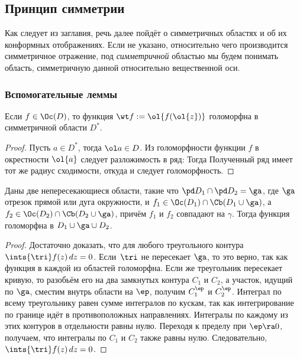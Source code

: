 \documentclass[a4paper]{article}
\begin{document}
\subsection{Принцип симметрии}

Как следует из заглавия, речь далее пойдёт о симметричных областях и об их конформных отображениях.
Если не указано, относительно чего производится симметричное отражение, под \emph{симметричной}
областью мы будем понимать область, симметричную данной относительно вещественной оси.

\subsubsection{Вспомогательные леммы}

\begin{lemma}
Если $f\in\Oc(D)$, то функция $\wt f := \ol{f(\ol{z})}$ голоморфна в симметричной области $D^*$.
\end{lemma}
\begin{proof}
Пусть $a \in D^*$, тогда $\ol a \in D$. Из голоморфности функции $f$ в окрестности $\ol{a}$ следует
разложимость в ряд:
Тогда
Полученный ряд имеет тот же радиус сходимости, откуда и следует голоморфность.
\end{proof}

\begin{lemma}
Даны две непересекающиеся области, такие что $\pd D_1 \cap \pd D_2=\ga$, где $\ga$\т отрезок прямой
или дуга окружности, и  $f_1 \in \Oc(D_1) \cap \Cb(D_1 \cup \ga)$, а $f_2 \in \Oc(D_2) \cap \Cb(D_2 \cup\ga)$, причём $f_1$ и $f_2$ совпадают на $\gamma$.
Тогда функция
голоморфна в $D_1 \cup \ga \cup D_2$.
\end{lemma}
\begin{proof}
Достаточно доказать, что для любого треугольного
контура $\ints{\tri} f(z)\,dz=0$. Если~$\tri$ не
пересекает $\ga$, то это верно, так как функция в каждой из областей голоморфна.
Если же треугольник пересекает кривую, то разобьём его на два замкнутых контура $C_1$ и $C_2$, а
участок, идущий по $\ga$, сместим внутрь области на $\ep$, получим $C_1^\ep$ и $C_2^\ep$.
Интеграл по всему треугольнику равен сумме интегралов по кускам, так как интегрирование по границе
идёт в противоположных направлениях. Интегралы по каждому из этих контуров в отдельности равны нулю.
Переходя к пределу при $\ep\ra 0$, получаем, что интегралы по $C_1$ и $C_2$  также равны нулю. Следовательно,
$\ints{\tri}f(z)\,dz=0$.
\end{proof}
\end{document}

